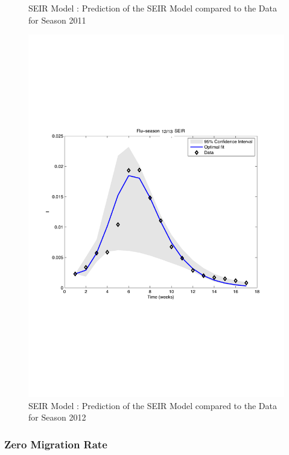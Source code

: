 \documentclass[11pt, a4paper]{article}
\begin{document}
\begin{figure}[h]
    \caption{SEIR Model : Prediction of the SEIR Model compared to the Data for Season 2011}
    \label{fig:seir_pred2}
    \includegraphics[height = 0.25\textheight]{figures/SEIR_prediction_season3.pdf}
    \caption{SEIR Model : Prediction of the SEIR Model compared to the Data for Season 2012}
    \label{fig:seir_pred3}
\end{figure}

\subsubsection{Zero Migration Rate}
\end{document}
